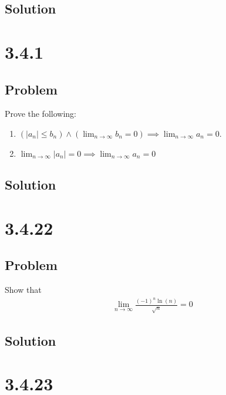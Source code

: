 \documentclass[12pt]{article}
\newcommand{\round}[1]{\left(       #1 \right)      }
\newcommand{\abs}  [1]{\left|       #1 \right|      }
\begin{document}
\subsection*{Solution}



\section*{3.4.1}

\subsection*{Problem}
Prove the following:
\begin{enumerate}
    \item $\round{\abs{a_n} \leq b_n} \wedge \round{\lim_{n \to \infty} b_n = 0} \implies \lim_{n \to \infty} a_n = 0$.
    \item $\lim_{n \to \infty} \abs{a_n} = 0 \implies \lim_{n \to \infty} a_n = 0$
\end{enumerate}

\subsection*{Solution}



\section*{3.4.22}

\subsection*{Problem}
Show that
\begin{align}
    \lim_{n \to \infty} \frac{(-1)^n \ln(n)}{\sqrt{n}} = 0
\end{align}

\subsection*{Solution}



\section*{3.4.23}
\end{document}
